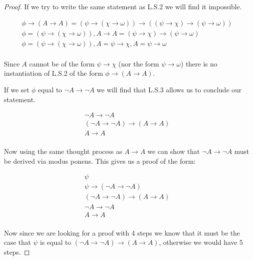 \documentclass{article}
\begin{document}
\begin{proof}
If we try to write the same statement as L.S.2 we will find it impossible.

\begin{gather*}
\phi \rightarrow (A \rightarrow A) = (\psi \rightarrow (\chi \rightarrow \omega)) \rightarrow ((\psi \rightarrow \chi) \rightarrow (\psi \rightarrow \omega)) \\
\phi = (\psi \rightarrow (\chi \rightarrow \omega)), A \rightarrow A = (\psi \rightarrow \chi) \rightarrow (\psi \rightarrow \omega) \\
\phi = (\psi \rightarrow (\chi \rightarrow \omega)), A = \psi \rightarrow \chi, A = \psi \rightarrow \omega \\
\end{gather*}

Since $A$ cannot be of the form $\psi \rightarrow \chi$ (nor the form $\psi \rightarrow \omega$) there is no instantiation of L.S.2 of the form $\phi \rightarrow (A \rightarrow A)$.

If we set $\phi$ equal to $\neg A \rightarrow \neg A$ we will find that L.S.3 allows us to conclude our statement.

\begin{gather*}
\neg A \rightarrow \neg A \tag{$\gamma$}\\
(\neg A \rightarrow \neg A) \rightarrow (A \rightarrow A) \tag*{L.S.3 ($\beta$)} \\
A \rightarrow A \tag*{Modus Ponens ($\alpha$)}\\
\end{gather*}

Now using the same thought process as $A \rightarrow A$ we can show that $\neg A \rightarrow \neg A$ must be derived via modus ponens.
This gives us a proof of the form:

\begin{gather*}
\psi \tag{$\eta$}\\
\psi \rightarrow (\neg A \rightarrow \neg A) \tag{$\delta$} \\
(\neg A \rightarrow \neg A) \rightarrow (A \rightarrow A) \tag*{L.S.3 ($\beta$)} \\
\neg A \rightarrow \neg A \tag*{Modus Ponens ($\gamma$)}\\
A \rightarrow A \tag*{Modus Ponens ($\alpha$)}\\
\end{gather*}

Now since we are looking for a proof with 4 steps we know that it must be the case that $\psi$ is equal to $(\neg A \rightarrow \neg A) \rightarrow (A \rightarrow A)$, otherwise we would have 5 steps.


\end{proof}
\end{document}
